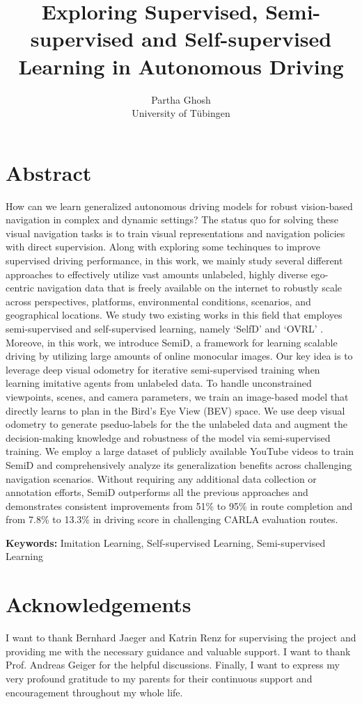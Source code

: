 \documentclass[letterpaper, 12pt]{book}
\author{Partha Ghosh\\University of Tübingen}
\date{}
\title{Exploring Supervised, Semi-supervised and Self-supervised Learning in Autonomous Driving}
\theoremstyle{definition}
\theoremstyle{definition}
\theoremstyle{definition}
\theoremstyle{definition}
\theoremstyle{definition}
\begin{document}
\maketitle


\chapter*{Abstract}
\label{sec:org6740400}
How can we learn generalized autonomous driving models for robust vision-based
 navigation in complex and dynamic settings? The status quo for solving these
 visual navigation tasks is to train visual representations and navigation
 policies with direct supervision. Along with exploring some techinques to
 improve supervised driving performance, in this work, we mainly study several
 different approaches to effectively utilize vast amounts unlabeled, highly
 diverse ego-centric navigation data that is freely available on the internet to
 robustly scale across perspectives, platforms, environmental conditions,
 scenarios, and geographical locations. We study two existing works in this
 field that employes semi-supervised and self-supervised learning, namely
 `SelfD' \cite{Zhang2022a} and `OVRL' \cite{Yadav2022}. Moreove, in this work,
 we introduce SemiD, a framework for learning scalable driving by utilizing
 large amounts of online monocular images. Our key idea is to leverage deep
 visual odometry for iterative semi-supervised training when learning imitative
 agents from unlabeled data. To handle unconstrained viewpoints, scenes, and
 camera parameters, we train an image-based model that directly learns to plan
 in the Bird’s Eye View (BEV) space. We use deep visual odometry to generate
 pseduo-labels for the the unlabeled data and augment the decision-making
 knowledge and robustness of the model via semi-supervised training. We employ a
 large dataset of publicly available YouTube videos to train SemiD and
 comprehensively analyze its generalization benefits across challenging
 navigation scenarios. Without requiring any additional data collection or
 annotation efforts, SemiD outperforms all the previous approaches and
 demonstrates consistent improvements from 51\% to 95\% in route completion and
 from 7.8\% to 13.3\% in driving score in challenging CARLA evaluation routes.

\textbf{Keywords:} Imitation Learning, Self-supervised Learning, Semi-supervised Learning

\clearpage 

\chapter*{Acknowledgements}
\label{sec:org85ffcf1}
I want to thank Bernhard Jaeger and Katrin Renz for supervising the project
and providing me with the necessary guidance and valuable support. I want to
thank Prof. Andreas Geiger for the helpful discussions. Finally, I want to
express my very profound gratitude to my parents for their continuous support
and encouragement throughout my whole life.
\end{document}
